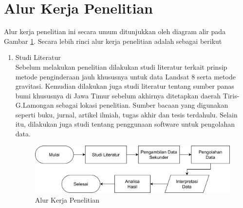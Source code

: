 \section{Alur Kerja Penelitian}
Alur kerja penelitian ini secara umum ditunjukkan oleh diagram alir pada Gambar \ref{fig:FlowChart}. Secara lebih rinci alur kerja penelitian adalah sebagai berikut
\begin{enumerate}
	\item Studi Literatur \\
	Sebelum melakukan penelitian dilakukan studi literatur terkait prinsip metode penginderaan jauh khususnya untuk data Landsat 8 serta metode gravitasi. Kemudian dilakukan juga studi literatur tentang sumber panas bumi khususnya di Jawa Timur sebelum akhirnya ditetapkan daerah Tiris-G.Lamongan sebagai lokasi penelitian. Sumber bacaan yang digunakan seperti buku, jurnal, artikel ilmiah, tugas akhir dan tesis terdahulu. Selain itu, dilakukan juga studi tentang penggunaan software untuk pengolahan data.
	\vskip 5pt
	\begin{figure}
		\centering
		\includegraphics{Figs/FC.png}
		\caption{Alur Kerja Penelitian}
		\label{fig:FlowChart}
	\end{figure}


\end{enumerate}
